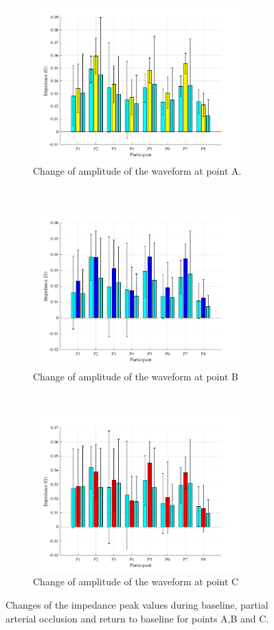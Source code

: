 \begin{figure}[h]
	\centering
	\begin{subfigure}[t]{0.5\textwidth}
	\centering
		\includegraphics[height=6cm,keepaspectratio]{figure7a}    
		\caption{Change of amplitude of the waveform at point A.}
		\label{fig:change_A_venous}
	\end{subfigure}%
	~ 
	\begin{subfigure}[t]{0.5\textwidth}
		\centering
		\includegraphics[height=6cm,keepaspectratio,keepaspectratio]{figure7b}    
		\caption{Change of amplitude of the waveform at point B}
		\label{fig:change_B_venous}
	\end{subfigure}
	~
	\begin{subfigure}[t]{0.5\textwidth}
		\centering
		\includegraphics[height=6cm,keepaspectratio]{figure7c}    
		\caption{Change of amplitude of the waveform at point C}
		\label{fig:change_C_venous}
\end{subfigure}%
	\caption{Changes of the impedance peak values during baseline, partial arterial occlusion and return to baseline for points A,B and C.}
	\label{fig:iPG_change_points_venous}
\end{figure}

